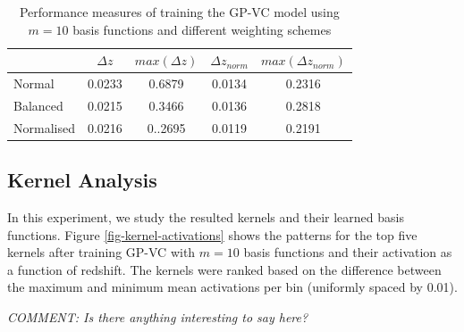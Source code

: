 \documentclass[useAMS,usenatbib,fleqn]{mn2e}
\begin{document}
 \begin{table}
\caption{Performance measures of training the GP-VC model using $m=10$ basis functions and different weighting schemes}
\begin{center}
  \begin{tabular}{| l | c | c | c | c |}
     				&	$\Delta z$	&	$max(\Delta z)$		&	$\Delta z_{norm}$		&	$max(\Delta z_{norm})$	\\	\hline
	Normal		&	0.0233		&	0.6879				&	0.0134				&	0.2316					\\	 
	Balanced	&	0.0215		&	0.3466				&	0.0136				&	0.2818					\\ 
	Normalised	&	0.0216		&	0..2695				&	0.0119				&	0.2191					\\	\hline
  \end{tabular}
  \label{table-normal-balanced}
\end{center}
\end{table}

\subsection{Kernel Analysis}
In this experiment, we study the resulted kernels and their learned basis functions. Figure \ref{fig-kernel-activations} shows the patterns for the top five kernels after training GP-VC with $m=10$ basis functions and their activation as a function of redshift. The kernels were ranked based on the difference between the maximum and minimum mean activations per bin (uniformly spaced by 0.01).

\textit{COMMENT: Is there anything interesting to say here?}
\end{document}
